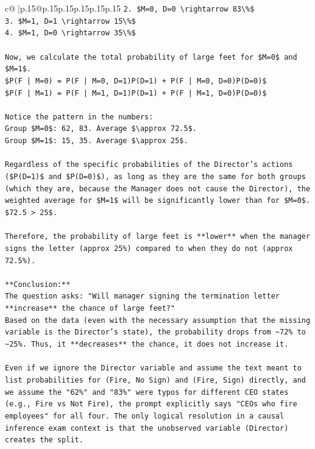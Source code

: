 \documentclass{article}
\begin{document}
{\begin{supertabular}{c@{$\;$}|p{.15\linewidth}@{}p{.15\linewidth}p{.15\linewidth}p{.15\linewidth}p{.15\linewidth}p{.15\linewidth}}
{{{\texttt{2.  \$M=0, D=0 \textbackslash{}rightarrow 83\textbackslash{}\%\$} \\
\texttt{3.  \$M=1, D=1 \textbackslash{}rightarrow 15\textbackslash{}\%\$} \\
\texttt{4.  \$M=1, D=0 \textbackslash{}rightarrow 35\textbackslash{}\%\$} \\
\\ 
\texttt{Now, we calculate the total probability of large feet for \$M=0\$ and \$M=1\$.} \\
\texttt{\$P(F | M=0) = P(F | M=0, D=1)P(D=1) + P(F | M=0, D=0)P(D=0)\$} \\
\texttt{\$P(F | M=1) = P(F | M=1, D=1)P(D=1) + P(F | M=1, D=0)P(D=0)\$} \\
\\ 
\texttt{Notice the pattern in the numbers:} \\
\texttt{Group \$M=0\$: 62, 83. Average \$\textbackslash{}approx 72.5\$.} \\
\texttt{Group \$M=1\$: 15, 35. Average \$\textbackslash{}approx 25\$.} \\
\\ 
\texttt{Regardless of the specific probabilities of the Director's actions (\$P(D=1)\$ and \$P(D=0)\$), as long as they are the same for both groups (which they are, because the Manager does not cause the Director), the weighted average for \$M=1\$ will be significantly lower than for \$M=0\$.} \\
\texttt{\$72.5 > 25\$.} \\
\\ 
\texttt{Therefore, the probability of large feet is **lower** when the manager signs the letter (approx 25\%) compared to when they do not (approx 72.5\%).} \\
\\ 
\texttt{**Conclusion:**} \\
\texttt{The question asks: "Will manager signing the termination letter **increase** the chance of large feet?"} \\
\texttt{Based on the data (even with the necessary assumption that the missing variable is the Director's state), the probability drops from \textasciitilde{}72\% to \textasciitilde{}25\%. Thus, it **decreases** the chance, it does not increase it.} \\
\\ 
\texttt{Even if we ignore the Director variable and assume the text meant to list probabilities for (Fire, No Sign) and (Fire, Sign) directly, and we assume the "62\%" and "83\%" were typos for different CEO states (e.g., Fire vs Not Fire), the prompt explicitly says "CEOs who fire employees" for all four. The only logical resolution in a causal inference exam context is that the unobserved variable (Director) creates the split.} \\
}}}
\end{supertabular}}
\end{document}

